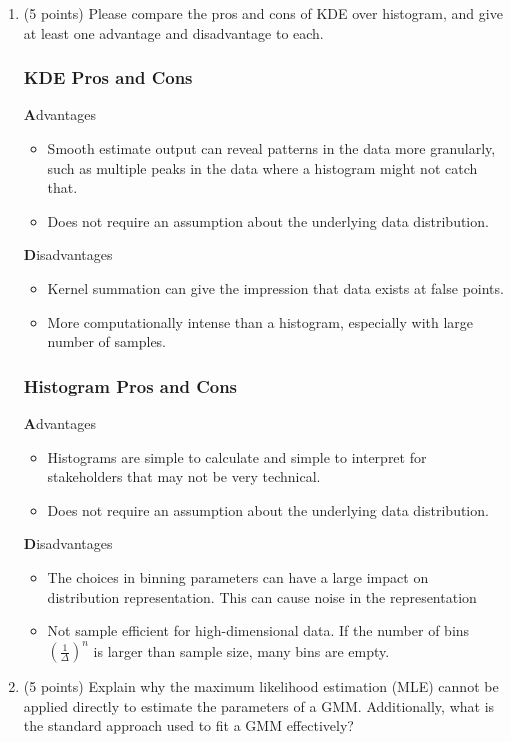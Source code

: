 \documentclass[twoside,12pt]{article}
\begin{document}
\begin{enumerate}[label*=\arabic*.]
\item (5 points) Please compare the pros and cons of KDE over histogram, and give at least one advantage and disadvantage to each.
\subsubsection{KDE Pros and Cons}
\textbf Advantages
\begin{itemize}
    \item Smooth estimate output can reveal patterns in the data more granularly, such as multiple peaks in the data where a histogram might not catch that.
    \item Does not require an assumption about the underlying data distribution.
\end{itemize}
\textbf Disadvantages
\begin{itemize}
    \item Kernel summation can give the impression that data exists at false points.
    \item More computationally intense than a histogram, especially with large number of samples.
\end{itemize}

\subsubsection{Histogram Pros and Cons}
\textbf Advantages
\begin{itemize}
    \item Histograms are simple to calculate and simple to interpret for stakeholders that may not be very technical.
    \item Does not require an assumption about the underlying data distribution.
\end{itemize}
\textbf Disadvantages
\begin{itemize}
    \item The choices in binning parameters can have a large impact on distribution representation. This can cause noise in the representation
    \item Not sample efficient for high-dimensional data. If the number of bins $(\frac{1}{\Delta})^n$ is larger than sample size, many bins are empty.
\end{itemize}

\item (5 points) Explain why the maximum likelihood estimation (MLE) cannot be applied directly to estimate the parameters of a GMM. Additionally, what is the standard approach used to fit a GMM effectively?
 

\end{enumerate}
\end{document}
